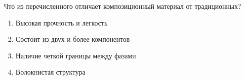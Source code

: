 
Что из перечисленного отличает композиционный материал от традиционных?

\begin{enumerate}
    \item Высокая прочность и легкость
    \item Состоит из двух и более компонентов
    \item Наличие четкой границы между фазами
    \item Волокнистая структура
\end{enumerate}